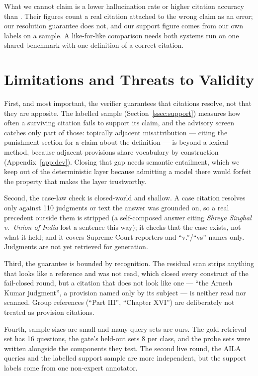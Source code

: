 \documentclass[conference]{IEEEtran}
\begin{document}
What we cannot claim is a lower hallucination rate or higher citation accuracy than \cite{bindra2026}. Their figures count a real citation attached to the wrong claim as an error; our resolution guarantee does not, and our support figure comes from our own labels on a sample. A like-for-like comparison needs both systems run on one shared benchmark with one definition of a correct citation.

\section{Limitations and Threats to Validity}

First, and most important, the verifier guarantees that citations resolve, not that they are apposite. The labelled sample (Section~\ref{ssec:support}) measures how often a surviving citation fails to support its claim, and the advisory screen catches only part of those: topically adjacent misattribution --- citing the punishment section for a claim about the definition --- is beyond a lexical method, because adjacent provisions share vocabulary by construction (Appendix~\ref{app:dev}). Closing that gap needs semantic entailment, which we keep out of the deterministic layer because admitting a model there would forfeit the property that makes the layer trustworthy.

Second, the case-law check is closed-world and shallow. A case citation resolves only against 110 judgments or text the answer was grounded on, so a real precedent outside them is stripped (a self-composed answer citing \emph{Shreya Singhal v.\ Union of India} lost a sentence this way); it checks that the case exists, not what it held; and it covers Supreme Court reporters and ``v.''/``vs'' names only. Judgments are not yet retrieved for generation.

Third, the guarantee is bounded by recognition. The residual scan strips anything that looks like a reference and was not read, which closed every construct of the fail-closed round, but a citation that does not look like one --- ``the Arnesh Kumar judgment'', a provision named only by its subject --- is neither read nor scanned. Group references (``Part III'', ``Chapter XVI'') are deliberately not treated as provision citations.

Fourth, sample sizes are small and many query sets are ours. The gold retrieval set has 16 questions, the gate's held-out sets 8 per class, and the probe sets were written alongside the components they test. The second live round, the AILA queries and the labelled support sample are more independent, but the support labels come from one non-expert annotator.
\end{document}
